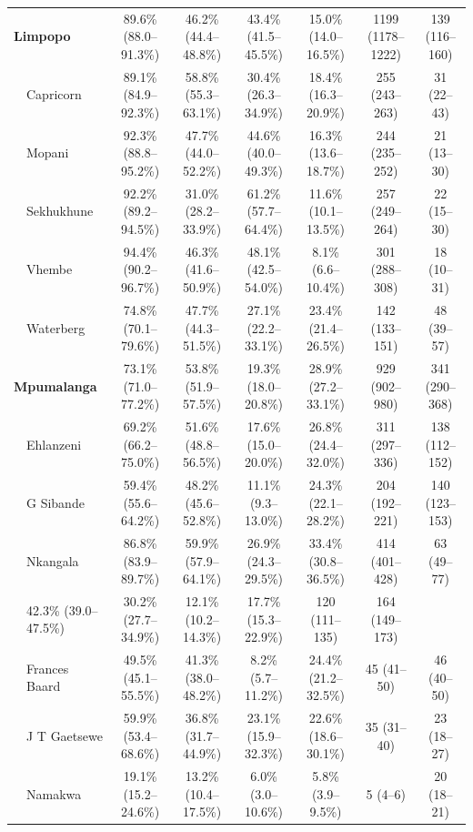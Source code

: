 \documentclass{article}
\begin{document}
\begin{landscape}
{\begin{longtable}[c]{llc cc ccc}
      \multicolumn{2}{l}{\textbf{Limpopo}} & 89.6\% (88.0--91.3\%) & 46.2\% (44.4--48.8\%) & 43.4\% (41.5--45.5\%) & 15.0\% (14.0--16.5\%) & 1199 (1178--1222) & 139 (116--160) \\
      & Capricorn & 89.1\% (84.9--92.3\%) & 58.8\% (55.3--63.1\%) & 30.4\% (26.3--34.9\%) & 18.4\% (16.3--20.9\%) & 255 (243--263) & 31 (22--43) \\
      & Mopani & 92.3\% (88.8--95.2\%) & 47.7\% (44.0--52.2\%) & 44.6\% (40.0--49.3\%) & 16.3\% (13.6--18.7\%) & 244 (235--252) & 21 (13--30) \\
      & Sekhukhune & 92.2\% (89.2--94.5\%) & 31.0\% (28.2--33.9\%) & 61.2\% (57.7--64.4\%) & 11.6\% (10.1--13.5\%) & 257 (249--264) & 22 (15--30) \\
      & Vhembe & 94.4\% (90.2--96.7\%) & 46.3\% (41.6--50.9\%) & 48.1\% (42.5--54.0\%) & 8.1\% (6.6--10.4\%) & 301 (288--308) & 18 (10--31) \\
      & Waterberg & 74.8\% (70.1--79.6\%) & 47.7\% (44.3--51.5\%) & 27.1\% (22.2--33.1\%) & 23.4\% (21.4--26.5\%) & 142 (133--151) & 48 (39--57) \\[5pt]
      \multicolumn{2}{l}{\textbf{Mpumalanga}} & 73.1\% (71.0--77.2\%) & 53.8\% (51.9--57.5\%) & 19.3\% (18.0--20.8\%) & 28.9\% (27.2--33.1\%) & 929 (902--980) & 341 (290--368) \\
      & Ehlanzeni & 69.2\% (66.2--75.0\%) & 51.6\% (48.8--56.5\%) & 17.6\% (15.0--20.0\%) & 26.8\% (24.4--32.0\%) & 311 (297--336) & 138 (112--152) \\
      & G Sibande & 59.4\% (55.6--64.2\%) & 48.2\% (45.6--52.8\%) & 11.1\% (9.3--13.0\%) & 24.3\% (22.1--28.2\%) & 204 (192--221) & 140 (123--153) \\
      & Nkangala & 86.8\% (83.9--89.7\%) & 59.9\% (57.9--64.1\%) & 26.9\% (24.3--29.5\%) & 33.4\% (30.8--36.5\%) & 414 (401--428) & 63 (49--77) \\
      \pagebreak
      \multicolumn{2}{l}{\textbf{Northern Cape}} & 42.3\% (39.0--47.5\%) & 30.2\% (27.7--34.9\%) & 12.1\% (10.2--14.3\%) & 17.7\% (15.3--22.9\%) & 120 (111--135) & 164 (149--173) \\
      & Frances Baard & 49.5\% (45.1--55.5\%) & 41.3\% (38.0--48.2\%) & 8.2\% (5.7--11.2\%) & 24.4\% (21.2--32.5\%) & 45 (41--50) & 46 (40--50) \\
      & J T Gaetsewe & 59.9\% (53.4--68.6\%) & 36.8\% (31.7--44.9\%) & 23.1\% (15.9--32.3\%) & 22.6\% (18.6--30.1\%) & 35 (31--40) & 23 (18--27) \\
      & Namakwa & 19.1\% (15.2--24.6\%) & 13.2\% (10.4--17.5\%) & 6.0\% (3.0--10.6\%) & 5.8\% (3.9--9.5\%) & 5 (4--6) & 20 (18--21) \\

\end{longtable}}
\end{landscape}
\end{document}
